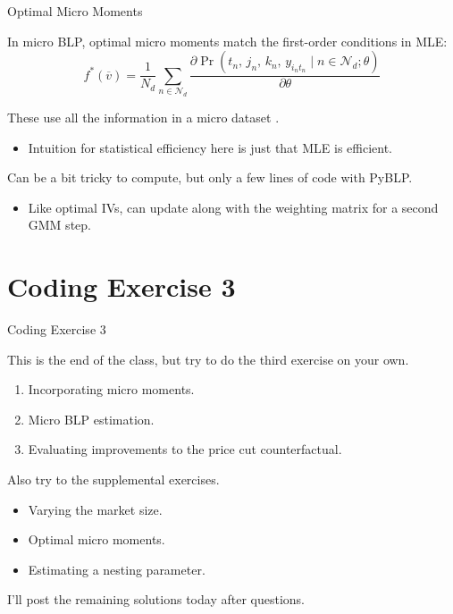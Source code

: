 \documentclass[aspectratio=169,t,11pt,table]{beamer}
\begin{document}
\begin{frame}{Optimal Micro Moments}
    \begin{wideitemize}
        \item In micro BLP, \alert{optimal micro moments} match the first-order conditions in MLE:
        \begin{equation*}
            f^*(\overline{v}) = \frac{1}{N_d} \sum_{n \in \mathcal{N}_d} \frac{\partial\Pr(t_n, \, j_n, \, k_n, \, y_{i_nt_n} \mid n \in \mathcal{N}_d; \theta)}{\partial\theta}
        \end{equation*}
        \vspace{-\baselineskip}
        \pause
        \item These use all the information in a micro dataset \citep{conlon2023incorporating}.
        \begin{itemize}
            \item Intuition for statistical efficiency here is just that MLE is efficient.
        \end{itemize}
        \pause
        \item Can be a bit tricky to compute, but only a few lines of code with PyBLP.
        \begin{itemize}
            \item Like optimal IVs, can update along with the weighting matrix for a second GMM step.
        \end{itemize}
    \end{wideitemize}
\end{frame}

\section{Coding Exercise 3}

\begin{frame}{Coding Exercise 3}
    \begin{wideitemize}
        \item This is the end of the class, but try to do the third exercise on your own.
        \begin{enumerate}
            \item Incorporating micro moments.
            \item Micro BLP estimation.
            \item Evaluating improvements to the price cut counterfactual.
        \end{enumerate}
        \pause
        \item Also try to the supplemental exercises.
        \begin{itemize}
            \item Varying the market size.
            \item Optimal micro moments.
            \item Estimating a nesting parameter.
        \end{itemize}
        \pause
        \item I'll post the remaining solutions today after questions.
    \end{wideitemize}
\end{frame}
\end{document}
